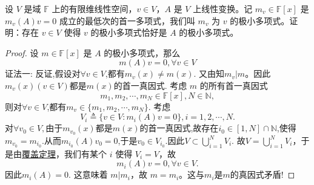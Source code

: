 \documentclass[../../main.tex]{subfiles}%
\begin{document}
\begin{example}
设 \( V \) 是域 \( \mathbb{F} \) 上的有限维线性空间，\( v \in V \)，\( A \) 是 \( V \) 上线性变换。记 \( m_v \in \mathbb{F}[x] \) 是 \( m_v(A)v = 0 \) 成立的最低次的首一多项式，我们叫 \( m_v \) 为 \( v \) 的极小多项式。证明：存在 \( v \in V \) 使得 \( v \) 的极小多项式恰好是 \( A \) 的极小多项式。
\end{example}
\begin{proof}
设 \( m \in \mathbb{F}[x] \) 是 \( A \) 的极小多项式，那么
\[
m(A)v = 0, \forall v \in V
\]
{\color{blue}证法一:}
反证,假设对$\forall v\in V$,都有$m_v(x)\ne m(x)$.
又由知\( m_v|m \)。因此$m_v(x)(v\in V)$都是$m(x)$的首一真因式.
考虑 \( m \) 的所有首一真因式
\[
m_1, m_2, \cdots, m_N \in \mathbb{F}[x],N\in\mathbb{N},
\]
则对$\forall v\in V$,都有$m_v\in \{m_1,m_2,\cdots,m_N\}$.
考虑
\[
V_i \triangleq \{ v \in V : m_i(A)v = 0 \}, i = 1, 2, \cdots, N.
\]
对$\forall v_0\in V,$由于$m_{v_0}(x)$都是$m(x)$的首一真因式,故存在$i_0\in [1,N]\cap \mathbb{N}$,使得$m_{v_0}=m_{i_0}$.从而$m_{i_0}(A)v_0=0$,于是$v_0\in V_{i_0}.$因此$V\subset \bigcup_{i=1}^N V_i.$
故\( V = \bigcup_{i=1}^N V_i \)，于是由\hyperref[theorem:覆盖定理]{覆盖定理}，我们有某个 \( i \) 使得 \( V_i = V \)，故$$m_i(A)v=0,\forall v\in V.$$
因此$m_i(A)=0.$
这意味着 \( m | m_i \)，故 \( m = m_i\)。这与$m_i$是$m$的真因式矛盾!


\end{proof}
\end{document}
